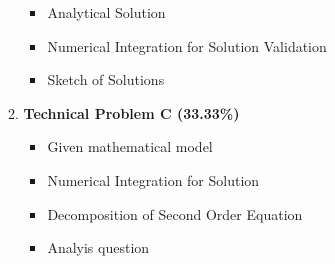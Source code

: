 \documentclass[11pt]{article}
\begin{document}
\begin{itemize}
\begin{enumerate}
\begin{itemize}
			\item Analytical Solution 
			\item Numerical Integration for Solution Validation 
			\item Sketch of Solutions \\

		\end{itemize}
		\item  \textbf{\Large Technical Problem C (33.33\%)}\\
		\begin{itemize}
			\item Given mathematical model 
			\item Numerical Integration	for Solution 
			\item Decomposition of Second Order Equation
			\item Analyis question


		\end{itemize}
	\end{enumerate}
%

\end{itemize}


	
\end{document}
